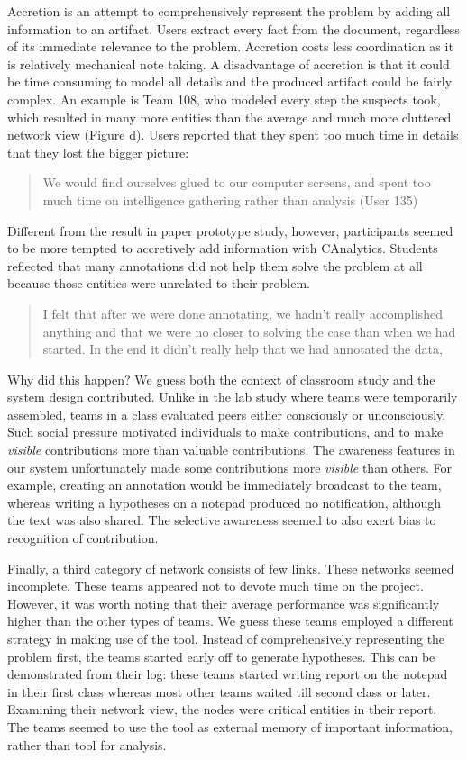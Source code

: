 Accretion is an attempt to comprehensively represent the problem by
adding all information to an artifact. Users extract every fact from the
document, regardless of its immediate relevance to the problem.
Accretion costs less coordination as it is relatively mechanical note
taking. A disadvantage of accretion is that it could be time consuming
to model all details and the produced artifact could be fairly complex.
An example is Team 108, who modeled every step the suspects took, which
resulted in many more entities than the average and much more cluttered
network view (Figure \autocite{fig:network}d). Users reported that they
spent too much time in details that they lost the bigger picture:

\begin{quote}
We would find ourselves glued to our computer screens, and spent too
much time on intelligence gathering rather than analysis (User 135)
\end{quote}

Different from the result in paper prototype study, however,
participants seemed to be more tempted to accretively add information
with CAnalytics. Students reflected that many annotations did not help
them solve the problem at all because those entities were unrelated to
their problem.

\begin{quote}
I felt that after we were done annotating, we hadn't really accomplished
anything and that we were no closer to solving the case than when we had
started. In the end it didn't really help that we had annotated the
data,
\end{quote}

Why did this happen? We guess both the context of classroom study and
the system design contributed. Unlike in the lab study where teams were
temporarily assembled, teams in a class evaluated peers either
consciously or unconsciously. Such social pressure motivated individuals
to make contributions, and to make \emph{visible} contributions more
than valuable contributions. The awareness features in our system
unfortunately made some contributions more \emph{visible} than others.
For example, creating an annotation would be immediately broadcast to
the team, whereas writing a hypotheses on a notepad produced no
notification, although the text was also shared. The selective awareness
seemed to also exert bias to recognition of contribution.

Finally, a third category of network consists of few links. These
networks seemed incomplete. These teams appeared not to devote much time
on the project. However, it was worth noting that their average
performance was significantly higher than the other types of teams. We
guess these teams employed a different strategy in making use of the
tool. Instead of comprehensively representing the problem first, the
teams started early off to generate hypotheses. This can be demonstrated
from their log: these teams started writing report on the notepad in
their first class whereas most other teams waited till second class or
later. Examining their network view, the nodes were critical entities in
their report. The teams seemed to use the tool as external memory of
important information, rather than tool for analysis.

